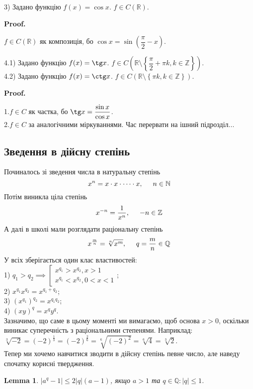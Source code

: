\documentclass[a4paper, 14pt]{article}
\makeatletter
\def\qed{$\blacksquare$}
\theoremstyle{theoremdd}
\theoremstyle{theoremdd}
\theoremstyle{theoremdd}
\theoremstyle{theoremdd}
\theoremstyle{theoremdd}
\theoremstyle{theoremdd}
\theoremstyle{theoremdd}
\newtheorem{lemma}[theorem]{Lemma}
\theoremstyle{theoremdd}
\renewenvironment{proof}[1][Proof.\\]{\par
\pushQED{\hfill \qed}%
\normalfont \topsep6\p@\@plus6\p@\relax
\trivlist
\item\relax
{\bfseries
#1\@addpunct{.}}\hspace\labelsep\ignorespaces
}{%
\popQED\endtrivlist\@endpefalse
}
\makeatother
\begin{document}
3) Задано функцію $f(x) = \cos x$. $f \in C(\mathbb{R})$.
\begin{proof}
$f \in C(\mathbb{R})$ як композиція, бо $\cos x = \sin\left(\dfrac{\pi}{2} -x \right)$.
\end{proof}

4.1) Задано функцію $f(x) = \tg x$. $f \in C\left(\mathbb{R} \setminus \left\{\dfrac{\pi}{2} + \pi k, k \in \mathbb{Z}\right\} \right)$.\\
4.2) Задано функцію $f(x) = \ctg x$. $f \in C\left(\mathbb{R} \setminus \left\{\pi k, k \in \mathbb{Z}\right\} \right)$.
\begin{proof}
1.$f \in C$ як частка, бо $\tg x = \dfrac{\sin x}{\cos x}$.\\
2.$f \in C$ за аналогічними міркуваннями.
\end{proof}
Час перервати на ішний підрозділ...

\subsection{Зведення в дійсну степінь}
Починалось зі зведення числа в натуральну степінь
$$x^n = x \cdot x \cdot \dots \cdot x, \hspace{0.5cm} n \in \mathbb{N}$$
Потім виникла ціла степінь
$$x^{-n} = \dfrac{1}{x^n}, \hspace{0.5cm} -n \in \mathbb{Z}$$
А далі в школі мали розглядати раціональну степінь
$$x^{\frac{m}{n}} = \sqrt[n]{x^m}, \hspace{0.5cm} q = \dfrac{m}{n} \in \mathbb{Q}$$
У всіх зберігається один клас властивостей:\\
1) $q_1 > q_2 \implies \left[ \begin{gathered} x^{q_1} > x^{q_2}, x>1 \\ x^{q_1} < x^{q_2}, 0<x<1 \end{gathered} \right.$;\\
2) $x^{q_1} x^{q_2} = x^{q_1+q_2}$;\\
3) $(x^{q_1})^{q_2} = x^{q_1q_2}$;\\
4) $(xy)^{q} = x^q y^q$.\\
Зазначимо, що саме в цьому моменті ми вимагаємо, щоб основа $x > 0$, оскільки виникає суперечність з раціональними степенями. Наприклад:\\
$\sqrt[3]{-2} = (-2)^{\frac{1}{3}} = (-2)^{\frac{2}{6}} = \sqrt[6]{(-2)^2} = \sqrt[6]{4} = \sqrt[3]{2}$.\\
Тепер ми хочемо навчитися зводити в дійсну степінь певне число, але наведу спочатку корисні твердження.
\begin{lemma}
$|a^q-1| \leq 2|q|(a-1)$, якщо $a>1$ та $q \in \mathbb{Q}: |q| \leq 1$.
\end{lemma}
\end{document}
